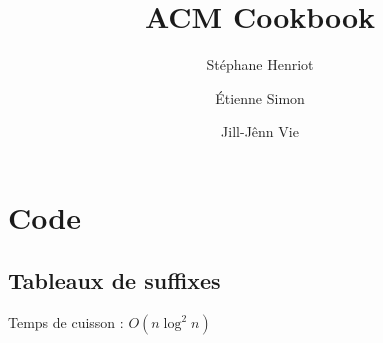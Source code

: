 \documentclass[12pt]{book}
\begin{document}
\title{ACM Cookbook}
\author{Stéphane Henriot \and Étienne Simon \and Jill-Jênn Vie}
\vspace{5cm}
\maketitle
\chapter{Code}
\section{Tableaux de suffixes}
Temps de cuisson : $O(n \log^2 n)$
{\tiny}
\end{document}
